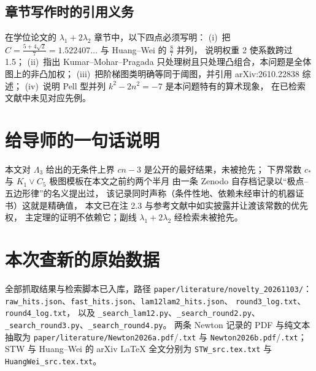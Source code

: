 \documentclass[UTF8,11pt]{ctexart}
\newcommand{\Lam}{\Lambda}
\newcommand{\cst}{c_\ast}
\begin{document}
\subsection{章节写作时的引用义务}

在学位论文的 $\lambda_1+2\lambda_2$ 章节中，以下四点必须写明：
(i)~把 $C=\frac{5+4\sqrt2}{7}=1.522407\ldots$ 与 Huang--Wei 的 $\frac87$ 并列，
说明权重 2 使系数跨过 1.5；
(ii)~指出 Kumar--Mohar--Pragada 只处理树且只处理凸组合，本问题是全体图上的非凸加权；
(iii)~把阶梯图类明确等同于阈图，并引用 arXiv:2610.22838 综述；
(iv)~说明 Pell 型并列 $k^2-2n^2=-7$ 是本问题特有的算术现象，
在已检索文献中未见对应先例。

\section{给导师的一句话说明}

本文对 $\Lam_3$ 给出的无条件上界 $cn-3$ 是公开的最好结果，未被抢先；
下界常数 $\cst$ 与 $K_1\vee C_5$ 极图模板在本文之前约两个半月
由一条 Zenodo 自存档记录以``极点--五边形律''的名义提出过，
该记录同时声称（条件性地、依赖未经审计的机器证书）这就是精确值，
本文已在注 2.3 与参考文献中如实披露并让渡该常数的优先权，
主定理的证明不依赖它；副线 $\lambda_1+2\lambda_2$ 经检索未被抢先。

\section{本次查新的原始数据}

全部抓取结果与检索脚本已入库，路径
\texttt{paper/literature/novelty\_20261103/}：
\texttt{raw\_hits.json}、\texttt{fast\_hits.json}、\texttt{lam12lam2\_hits.json}、
\texttt{round3\_log.txt}、\texttt{round4\_log.txt}，
以及 \texttt{\_search\_lam12.py}、\texttt{\_search\_round2.py}、
\texttt{\_search\_round3.py}、\texttt{\_search\_round4.py}。
两条 Newton 记录的 PDF 与纯文本抽取为
\texttt{paper/literature/Newton2026a.pdf}/\texttt{.txt} 与
\texttt{Newton2026b.pdf}/\texttt{.txt}；
STW 与 Huang--Wei 的 arXiv LaTeX 全文分别为
\texttt{STW\_src.tex.txt} 与 \texttt{HuangWei\_src.tex.txt}。
\end{document}
